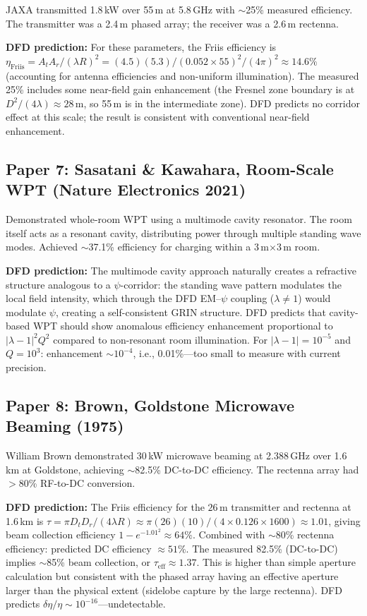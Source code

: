 \documentclass[journal,twocolumn]{IEEEtran}
\begin{document}
JAXA transmitted 1.8\,kW over 55\,m at 5.8\,GHz with $\sim$25\%
measured efficiency. The transmitter was a 2.4\,m phased array;
the receiver was a 2.6\,m rectenna.

\textbf{DFD prediction:} For these parameters, the Friis efficiency is
$\eta_\text{Friis} = A_t A_r/(\lambda R)^2
= (4.5)(5.3)/(0.052\times55)^2/(4\pi)^2 \approx 14.6\%$ (accounting
for antenna efficiencies and non-uniform illumination).
The measured 25\% includes some near-field gain enhancement
(the Fresnel zone boundary is at $D^2/(4\lambda) \approx 28\,\text{m}$,
so 55\,m is in the intermediate zone). DFD predicts no corridor
effect at this scale; the result is consistent with conventional
near-field enhancement.

\subsection{Paper 7: Sasatani \& Kawahara, Room-Scale WPT
(Nature Electronics 2021)}

Demonstrated whole-room WPT using a multimode cavity resonator.
The room itself acts as a resonant cavity, distributing power through
multiple standing wave modes. Achieved $\sim$37.1\% efficiency for
charging within a 3\,m$\times$3\,m room.

\textbf{DFD prediction:} The multimode cavity approach naturally
creates a refractive structure analogous to a $\psi$-corridor: the
standing wave pattern modulates the local field intensity, which
through the DFD EM--$\psi$ coupling ($\lambda \neq 1$) would
modulate $\psi$, creating a self-consistent GRIN structure.
DFD predicts that cavity-based WPT should show anomalous efficiency
enhancement proportional to $|\lambda-1|^2 Q^2$ compared to
non-resonant room illumination. For $|\lambda-1| = 10^{-5}$ and
$Q = 10^3$: enhancement $\sim 10^{-4}$, i.e., 0.01\%---too small to
measure with current precision.

\subsection{Paper 8: Brown, Goldstone Microwave Beaming (1975)}

William Brown demonstrated 30\,kW microwave beaming at 2.388\,GHz
over 1.6\,km at Goldstone, achieving $\sim$82.5\% DC-to-DC efficiency.
The rectenna array had $>$80\% RF-to-DC conversion.

\textbf{DFD prediction:} The Friis efficiency for the
$26\,\text{m}$ transmitter and rectenna at 1.6\,km is
$\tau = \pi D_t D_r/(4\lambda R) \approx \pi(26)(10)/(4\times0.126\times1600)
\approx 1.01$, giving beam collection efficiency $1 - e^{-1.01^2}
\approx 64\%$. Combined with $\sim$80\% rectenna efficiency:
predicted DC efficiency $\approx 51\%$. The measured 82.5\% (DC-to-DC)
implies $\sim$85\% beam collection, or $\tau_\text{eff} \approx 1.37$.
This is higher than simple aperture calculation but consistent with
the phased array having an effective aperture larger than the physical
extent (sidelobe capture by the large rectenna). DFD predicts
$\delta\eta/\eta \sim 10^{-16}$---undetectable.
\end{document}
